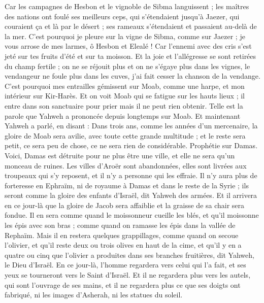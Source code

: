 \begin{multicols}{2}
Car les campagnes de Hesbon et le vignoble de Sibma languissent ; les maîtres des nations ont foulé ses meilleurs ceps, qui s'étendaient jusqu'à Jaezer, qui couraient ça et là par le désert ; ses rameaux s'étendaient et passaient au-delà de la mer.
C'est pourquoi je pleure sur la vigne de Sibma, comme sur Jaezer ; je vous arrose de mes larmes, ô Hesbon et Elealé ! Car l'ennemi avec des cris s'est jeté sur tes fruits d'été et sur ta moisson.
Et la joie et l'allégresse se sont retirées du champ fertile ; on ne se réjouit plus et on ne s'égaye plus dans les vignes, le vendangeur ne foule plus dans les cuves, j'ai fait cesser la chanson de la vendange.
C'est pourquoi mes entrailles gémissent sur Moab, comme une harpe, et mon intérieur sur Kir-Harès.
Et on voit Moab qui se fatigue sur les hauts lieux ; il entre dans son sanctuaire pour prier mais il ne peut rien obtenir.
Telle est la parole que Yahweh a prononcée depuis longtemps sur Moab.
Et maintenant Yahweh a parlé, en disant : Dans trois ans, comme les années d'un mercenaire, la gloire de Moab sera avilie, avec toute cette grande multitude ; et le reste sera petit, ce sera peu de chose, ce ne sera rien de considérable.
\VerseOne{}Prophétie sur Damas. Voici, Damas est détruite pour ne plus être une ville, et elle ne sera qu'un monceau de ruines.
Les villes d'Aroër sont abandonnées, elles sont livrées aux troupeaux qui s'y reposent, et il n'y a personne qui les effraie.
Il n'y aura plus de forteresse en Ephraïm, ni de royaume à Damas et dans le reste de la Syrie ; ils seront comme la gloire des enfants d'Israël, dit Yahweh des armées.
Et il arrivera en ce jour-là que la gloire de Jacob sera affaiblie et la graisse de sa chair sera fondue.
Il en sera comme quand le moissonneur cueille les blés, et qu'il moissonne les épis avec son bras ; comme quand on ramasse les épis dans la vallée de Rephaïm.
Mais il en restera quelques grappillages, comme quand on secoue l'olivier, et qu'il reste deux ou trois olives en haut de la cime, et qu'il y en a quatre ou cinq que l'olivier a produites dans ses branches fruitières, dit Yahweh, le Dieu d'Israël.
En ce jour-là, l'homme regardera vers celui qui l'a fait, et ses yeux se tourneront vers le Saint d'Israël.
Et il ne regardera plus vers les autels, qui sont l'ouvrage de ses mains, et il ne regardera plus ce que ses doigts ont fabriqué, ni les images d'Asherah, ni les statues du soleil.

\end{multicols}
